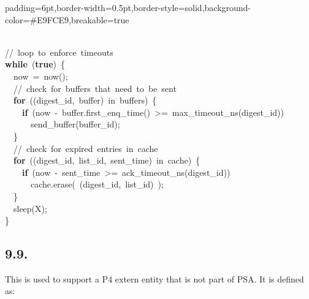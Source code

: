 \documentclass[11pt]{article}
\begin{document}
{\begin{mdbmargintb}{6pt}{6pt}
\begin{mdblock}{padding=6pt,border-width=0.5pt,border-style=solid,background-color=\#E9FCE9,breakable=true}
\begin{mdpre}
{{\\
{//~loop~to~enforce~timeouts}\\
{\bfseries{while}}~({\bfseries{true}})~\{\\
~~now~=~now();\\
~~{//~check~for~buffers~that~need~to~be~sent}\\
~~{\bfseries{for}}~((digest\_id,~buffer)~in~buffers)~\{\\
~~~~{\bfseries{if}}~(now~-~buffer.first\_enq\_time()~\textgreater{}=~max\_timeout\_ns(digest\_id))\\
~~~~~~send\_buffer(buffer\_id);\\
~~\}\\
~~{//~check~for~expired~entries~in~cache}\\
~~{\bfseries{for}}~((digest\_id,~list\_id,~sent\_time)~in~cache)~\{\\
~~~~{\bfseries{if}}~(now~-~sent\_time~\textgreater{}=~ack\_timeout\_ns(digest\_id))\\
~~~~~~cache.erase(~(digest\_id,~list\_id)~);\\
~~\}\\
~~sleep({X});\\
\}}}%
\end{mdpre}%
\end{mdblock}%
\end{mdbmargintb}%

\subsection{9.9.\hspace*{0.5em}}\label{sec-extern-entry}%

\noindent{}This is used to support a P4 extern entity that is not part of PSA. It is
defined as:%

}
\end{document}
